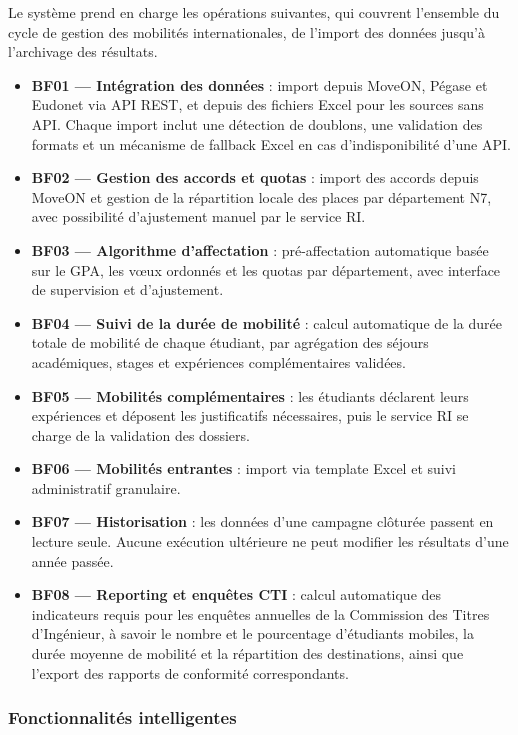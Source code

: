 Le système prend en charge les opérations suivantes, qui couvrent l'ensemble du cycle de gestion des mobilités internationales, de l'import des données jusqu'à l'archivage des résultats.

\begin{itemize}
    \item \textbf{BF01 --- Intégration des données} : import depuis MoveON, Pégase et Eudonet via API REST, et depuis des fichiers Excel pour les sources sans API. Chaque import inclut une détection de doublons, une validation des formats et un mécanisme de fallback Excel en cas d'indisponibilité d'une API.
    \item \textbf{BF02 --- Gestion des accords et quotas} : import des accords depuis MoveON et gestion de la répartition locale des places par département N7, avec possibilité d'ajustement manuel par le service RI.
    \item \textbf{BF03 --- Algorithme d'affectation} : pré-affectation automatique basée sur le GPA, les vœux ordonnés et les quotas par département, avec interface de supervision et d'ajustement.
    \item \textbf{BF04 --- Suivi de la durée de mobilité} : calcul automatique de la durée totale de mobilité de chaque étudiant, par agrégation des séjours académiques, stages et expériences complémentaires validées.
    \item \textbf{BF05 --- Mobilités complémentaires} : les étudiants déclarent leurs expériences et déposent les justificatifs nécessaires, puis le service RI se charge de la validation des dossiers.
    \item \textbf{BF06 --- Mobilités entrantes} : import via template Excel et suivi administratif granulaire.
    \item \textbf{BF07 --- Historisation} : les données d'une campagne clôturée passent en lecture seule. Aucune exécution ultérieure ne peut modifier les résultats d'une année passée.
    \item \textbf{BF08 --- Reporting et enquêtes CTI} : calcul automatique des indicateurs requis pour les enquêtes annuelles de la Commission des Titres d'Ingénieur, à savoir le nombre et le pourcentage d'étudiants mobiles, la durée moyenne de mobilité et la répartition des destinations, ainsi que l'export des rapports de conformité correspondants.
\end{itemize}

\subsubsection{Fonctionnalités intelligentes}

